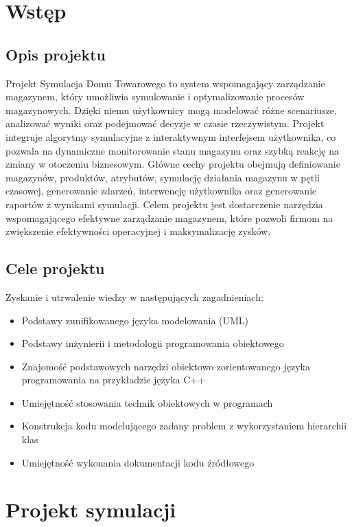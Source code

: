 \documentclass[11pt]{article}
\begin{document}
\newpage




\section{Wstęp}
\subsection{Opis projektu}
Projekt Symulacja Domu Towarowego to system wspomagający zarządzanie magazynem, który umożliwia symulowanie i optymalizowanie procesów magazynowych. Dzięki niemu użytkownicy mogą modelować różne scenariusze, analizować wyniki oraz podejmować decyzje w czasie rzeczywistym. Projekt integruje algorytmy symulacyjne z interaktywnym interfejsem użytkownika, co pozwala na dynamiczne monitorowanie stanu magazynu oraz szybką reakcję na zmiany w otoczeniu biznesowym. Główne cechy projektu obejmują definiowanie magazynów, produktów, atrybutów, symulację działania magazynu w pętli czasowej, generowanie zdarzeń, interwencję użytkownika oraz generowanie raportów z wynikami symulacji. Celem projektu jest dostarczenie narzędzia wspomagającego efektywne zarządzanie magazynem, które pozwoli firmom na zwiększenie efektywności operacyjnej i maksymalizację zysków.

\subsection{Cele projektu}
Zyskanie i utrwalenie wiedzy w następujących zagadnieniach:

\begin{itemize}
    \item Podstawy zunifikowanego języka modelowania (UML)
    \item Podstawy inżynierii i metodologii programowania obiektowego
    \item Znajomość podstawowych narzędzi obiektowo zorientowanego języka programowania na przykładzie języka C++
    \item Umiejętność stosowania technik obiektowych w programach
    \item Konstrukcja kodu modelującego zadany problem z wykorzystaniem hierarchii klas
    \item Umiejętność wykonania dokumentacji kodu źródłowego
\end{itemize}

\section{Projekt symulacji}
\end{document}
